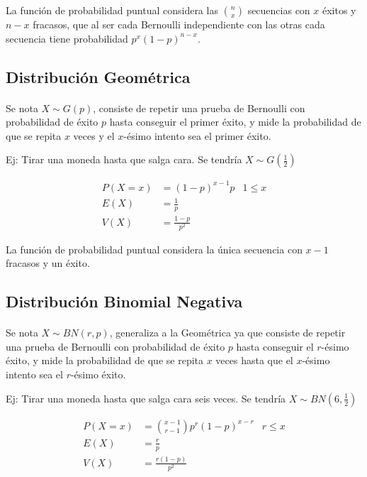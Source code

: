 \documentclass[../main.tex]{subfiles}
\begin{document}
La función de probabilidad puntual considera las \(\binom{n}{x}\) secuencias con \(x\) éxitos y \(n-x\) fracasos, que al ser cada Bernoulli independiente con las otras cada secuencia tiene probabilidad \(p^{x}(1-p)^{n-x}\).

\subsection{Distribución Geométrica}

\paragraph{} Se nota \(X \sim G(p)\), consiste de repetir una prueba de Bernoulli con probabilidad de éxito \(p\) hasta conseguir el primer éxito, y mide la probabilidad de que se repita \(x\) veces y el \(x\)-ésimo intento sea el primer éxito.

Ej: Tirar una moneda hasta que salga cara. Se tendría \(X \sim G(\frac{1}{2})\)

\begin{align*}
  P(X = x) &= (1-p)^{x-1}p & 1 \leq x \\
  E(X) &= \frac{1}{p} \\
  V(X) &= \frac{1-p}{p^{2}}
\end{align*}

La función de probabilidad puntual considera la única secuencia con \(x-1\) fracasos y un éxito.

\subsection{Distribución Binomial Negativa}

\paragraph{} Se nota \(X \sim BN(r, p)\), generaliza a la Geométrica ya que consiste de repetir una prueba de Bernoulli con probabilidad de éxito \(p\) hasta conseguir el \(r\)-ésimo éxito, y mide la probabilidad de que se repita \(x\) veces hasta que el \(x\)-ésimo intento sea el \(r\)-ésimo éxito.

Ej: Tirar una moneda hasta que salga cara seis veces. Se tendría \(X \sim BN(6, \frac{1}{2})\)

\begin{align*}
  P(X = x) &= \binom{x-1}{r-1}p^{r}(1-p)^{x-r} & r \leq x \\
  E(X) &= \frac{r}{p} \\
  V(X) &= \frac{r(1-p)}{p^{2}}
\end{align*}
\end{document}
